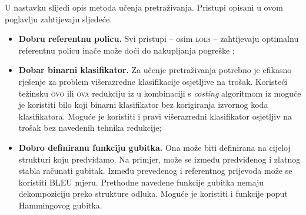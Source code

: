 U nastavku slijedi opis metoda učenja pretraživanja. Pristupi opisani u ovom
poglavlju zahtijevaju sljedeće.

\begin{itemize}

  \item \textbf{Dobru referentnu policu.} Svi pristupi -- osim \textsc{lols} --
  zahtijevaju optimalnu referentnu policu inače može doći do nakupljanja
  pogreške ;

  \item \textbf{Dobar binarni klasifikator.} Za učenje pretraživanja potrebno je
  efikasno rješenje za problem višerazredne klasifikacije osjetljive na trošak.
  Koristeći težinsku \textsc{ovo} ili \textsc{ova}  redukciju iz \citep{beygelzimer2005weighted,
  beygelzimer2005error} u kombinaciji s \textit{costing} algoritmom iz
  \citep{zadrozny2003cost} moguće je koristiti bilo koji binarni klasifikator
  bez korigiranja izvornog koda klasifikatora. Moguće je koristiti i pravi
  višerazredni klasifikator osjetljiv na trošak bez navedenih tehnika redukcije;

  \item \textbf{Dobro definiranu funkciju gubitka.} Ona može biti definirana na
  cijeloj strukturi koju predviđamo. Na primjer, može se između predviđenog i
  zlatnog stabla računati  gubitak. Između prevedenog i
  referentnog prijevoda može se koristiti BLEU  mjeru. Prethodne navedene funkcije gubitka nemaju
  dekompoziciju preko strukture odluka. Moguće je koristiti i funkcije poput
  Hammingovog gubitka.

\end{itemize}
